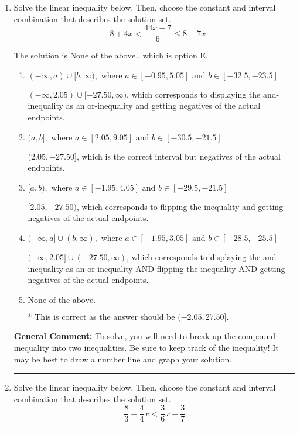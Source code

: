 \documentclass{extbook}[14pt]
\newcommand{\litem}[1]{\item #1

\rule{\textwidth}{0.4pt}}
\begin{document}
\begin{enumerate}
{\begin{enumerate}[label=\Alph*.]
You may have chosen this if you thought the inequality did not match the ends of the intervals.
\end{enumerate}

\textbf{General Comment:} Remember that less/greater than or equal to includes the endpoint, while less/greater do not. Also, remember that you need to flip the inequality when you multiply or divide by a negative.
}
\litem{
Solve the linear inequality below. Then, choose the constant and interval combination that describes the solution set.
\[ -8 + 4 x < \frac{44 x - 7}{6} \leq 8 + 7 x \]

The solution is \( \text{None of the above.} \), which is option E.\begin{enumerate}[label=\Alph*.]
\item \( (-\infty, a) \cup [b, \infty), \text{ where } a \in [-0.95, 5.05] \text{ and } b \in [-32.5, -23.5] \)

$(-\infty, 2.05) \cup [-27.50, \infty)$, which corresponds to displaying the and-inequality as an or-inequality and getting negatives of the actual endpoints.
\item \( (a, b], \text{ where } a \in [2.05, 9.05] \text{ and } b \in [-30.5, -21.5] \)

$(2.05, -27.50]$, which is the correct interval but negatives of the actual endpoints.
\item \( [a, b), \text{ where } a \in [-1.95, 4.05] \text{ and } b \in [-29.5, -21.5] \)

$[2.05, -27.50)$, which corresponds to flipping the inequality and getting negatives of the actual endpoints.
\item \( (-\infty, a] \cup (b, \infty), \text{ where } a \in [-1.95, 3.05] \text{ and } b \in [-28.5, -25.5] \)

$(-\infty, 2.05] \cup (-27.50, \infty)$, which corresponds to displaying the and-inequality as an or-inequality AND flipping the inequality AND getting negatives of the actual endpoints.
\item \( \text{None of the above.} \)

* This is correct as the answer should be $(-2.05, 27.50]$.
\end{enumerate}

\textbf{General Comment:} To solve, you will need to break up the compound inequality into two inequalities. Be sure to keep track of the inequality! It may be best to draw a number line and graph your solution.
}
\litem{
Solve the linear inequality below. Then, choose the constant and interval combination that describes the solution set.
\[ \frac{8}{3} - \frac{4}{4} x < \frac{3}{6} x + \frac{3}{7} \]

}
\end{enumerate}
\end{document}
